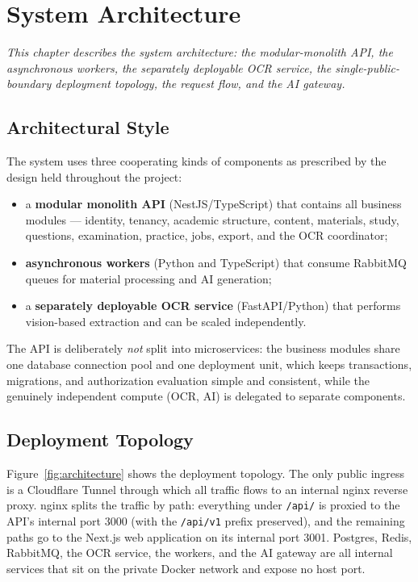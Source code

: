 \chapter{System Architecture}
\label{ch:architecture}

\begin{center}
\textit{This chapter describes the system architecture: the modular-monolith
API, the asynchronous workers, the separately deployable OCR service, the
single-public-boundary deployment topology, the request flow, and the AI
gateway.}
\end{center}

\vspace*{\fill}
\clearpage
\section{Architectural Style}

\noindent The system uses three cooperating kinds of components as prescribed
by the design held throughout the project:

\begin{itemize}
  \item a \textbf{modular monolith API} (NestJS/TypeScript) that contains all
  business modules --- identity, tenancy, academic structure, content,
  materials, study, questions, examination, practice, jobs, export, and the
  OCR coordinator;
  \item \textbf{asynchronous workers} (Python and TypeScript) that consume
  RabbitMQ queues for material processing and AI generation;
  \item a \textbf{separately deployable OCR service} (FastAPI/Python) that
  performs vision-based extraction and can be scaled independently.
\end{itemize}

\noindent The API is deliberately \emph{not} split into microservices: the
business modules share one database connection pool and one deployment unit,
which keeps transactions, migrations, and authorization evaluation simple and
consistent, while the genuinely independent compute (OCR, AI) is delegated to
separate components.

\section{Deployment Topology}

\noindent Figure~\ref{fig:architecture} shows the deployment topology. The
only public ingress is a Cloudflare Tunnel through which all traffic flows to
an internal nginx reverse proxy. nginx splits the traffic by path: everything
under \texttt{/api/} is proxied to the API's internal port 3000 (with the
\texttt{/api/v1} prefix preserved), and the remaining paths go to the
Next.js web application on its internal port 3001. Postgres, Redis,
RabbitMQ, the OCR service, the workers, and the AI gateway are all internal
services that sit on the private Docker network and expose no host port.

